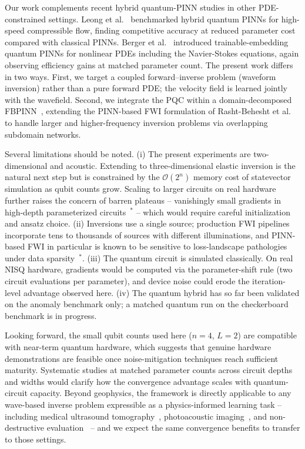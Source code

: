 \documentclass[11pt,a4paper]{article}
\newcommand{\newcite}[1]{\textcolor{todoRed}{$^{\ast}$}\citep{#1}}
\begin{document}
Our work complements recent hybrid quantum-PINN studies in other PDE-constrained settings. Leong et al.~\cite{LEONG2025106782} benchmarked hybrid quantum PINNs for high-speed compressible flow, finding competitive accuracy at reduced parameter cost compared with classical PINNs. Berger et al.~\cite{Berger2025} introduced trainable-embedding quantum PINNs for nonlinear PDEs including the Navier-Stokes equations, again observing efficiency gains at matched parameter count. The present work differs in two ways. First, we target a coupled forward--inverse problem (waveform inversion) rather than a pure forward PDE; the velocity field is learned jointly with the wavefield. Second, we integrate the PQC within a domain-decomposed FBPINN~\cite{Moseley2023}, extending the PINN-based FWI formulation of Rasht-Behesht et al.~\cite{rahst} to handle larger and higher-frequency inversion problems via overlapping subdomain networks.

Several limitations should be noted. (i) The present experiments are two-dimensional and acoustic. Extending to three-dimensional elastic inversion is the natural next step but is constrained by the $\mathcal{O}(2^n)$ memory cost of statevector simulation as qubit counts grow. Scaling to larger circuits on real hardware further raises the concern of barren plateaus -- vanishingly small gradients in high-depth parameterized circuits~\newcite{mcclean2018barren} -- which would require careful initialization and ansatz choice. (ii) Inversions use a single source; production FWI pipelines incorporate tens to thousands of sources with different illuminations, and PINN-based FWI in particular is known to be sensitive to loss-landscape pathologies under data sparsity~\newcite{krishnapriyan2021failure}. (iii) The quantum circuit is simulated classically. On real NISQ hardware, gradients would be computed via the parameter-shift rule (two circuit evaluations per parameter), and device noise could erode the iteration-level advantage observed here. (iv) The quantum hybrid has so far been validated on the anomaly benchmark only; a matched quantum run on the checkerboard benchmark is in progress.

Looking forward, the small qubit counts used here ($n=4$, $L=2$) are compatible with near-term quantum hardware, which suggests that genuine hardware demonstrations are feasible once noise-mitigation techniques reach sufficient maturity. Systematic studies at matched parameter counts across circuit depths and widths would clarify how the convergence advantage scales with quantum-circuit capacity. Beyond geophysics, the framework is directly applicable to any wave-based inverse problem expressible as a physics-informed learning task -- including medical ultrasound tomography~\cite{10.1121/1.3699240,Sandhu_2015}, photoacoustic imaging~\cite{Wang2016}, and non-destructive evaluation~\cite{7422116} -- and we expect the same convergence benefits to transfer to those settings.
\end{document}
